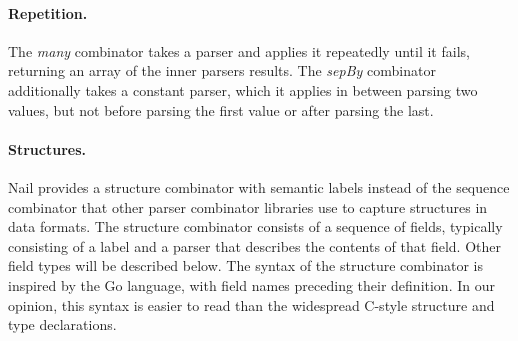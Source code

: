 \paragraph{Repetition.}

The \emph{many} combinator takes a parser and applies it repeatedly
until it fails, returning an array of the inner parsers results. The
\emph{sepBy} combinator
additionally takes a constant parser, which it applies in between parsing
two values, but not before parsing the first value or after parsing the
last.

\paragraph{Structures.}




Nail provides a structure combinator with semantic labels instead of the sequence combinator that
other parser combinator libraries use to capture structures in data formats. 
The structure combinator consists of a sequence of fields, typically consisting of a label and a
parser that describes the contents of that field. Other field types will be described below.
 The syntax of the structure combinator is inspired by the Go language\cite{golang}, with field names preceding their definition.
In our opinion, this syntax is easier to read than the widespread C-style structure and type
declarations.


